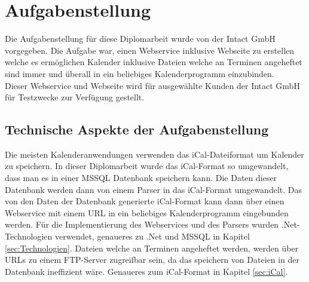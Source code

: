 \renewcommand{\theauthor}{Matthias Franz}

\section{Aufgabenstellung}
\label{sec:Aufgabenstellung}
Die Aufgabenstellung für diese Diplomarbeit wurde von der Intact GmbH vorgegeben. Die Aufgabe war, einen Webservice inklusive Webseite zu erstellen welche es ermöglichen Kalender inklusive Dateien welche an Terminen angeheftet sind immer und überall in ein beliebiges Kalenderprogramm einzubinden. \\
Dieser Webservice und Webseite wird für ausgewählte Kunden der Intact GmbH für Testzwecke zur Verfügung gestellt. \\

\subsection{Technische Aspekte der Aufgabenstellung}
\label{sec:TechnischeAspekteDerAufgabenstellung}
Die meisten Kalenderanwendungen verwenden das iCal-Dateiformat um Kalender zu speichern. In dieser Diplomarbeit wurde das iCal-Format so umgewandelt, dass man es in einer MSSQL Datenbank speichern kann. Die Daten dieser Datenbank werden dann von einem Parser in das iCal-Format umgewandelt. Das von den Daten der Datenbank generierte iCal-Format kann dann über einen Webservice mit einem URL in ein beliebiges Kalenderprogramm eingebunden werden. Für die Implementierung des Webservices und des Parsers wurden .Net-Technologien verwendet, genaueres zu .Net und MSSQL in Kapitel \ref{sec:Technologien}.  Dateien welche an Terminen angeheftet werden, werden über URLs zu einem FTP-Server zugreifbar sein, da das speichern von Dateien in der Datenbank ineffizient wäre. Genaueres zum iCal-Format in Kapitel \ref{sec:iCal}.
\pagebreak